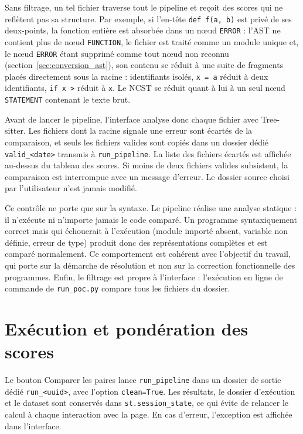 \documentclass[12pt,a4paper,oneside]{report}
\begin{document}
Sans filtrage, un tel fichier traverse tout le pipeline et reçoit des scores
qui ne reflètent pas sa structure. Par exemple, si l'en-tête
\texttt{def f(a, b)} est privé de ses deux-points, la fonction entière est
absorbée dans un nœud \texttt{ERROR} : l'AST ne contient plus de nœud
\texttt{FUNCTION}, le fichier est traité comme un module unique et, le
nœud \texttt{ERROR} étant supprimé comme tout nœud non reconnu
(section~\ref{sec:conversion_ast}), son contenu se réduit à une suite de
fragments placés directement sous la racine : identifiants isolés,
\texttt{x = a} réduit à deux identifiants, \texttt{if x >} réduit à
\texttt{x}. Le NCST se réduit quant à lui à un seul nœud \texttt{STATEMENT}
contenant le texte brut.

Avant de lancer le pipeline, l'interface analyse donc chaque fichier avec
Tree-sitter. Les fichiers dont la racine signale une erreur sont écartés de
la comparaison, et seuls les fichiers valides sont copiés dans un dossier
dédié \texttt{valid\_<date>} transmis à \texttt{run\_pipeline}. La liste des
fichiers écartés est affichée au-dessus du tableau des scores. Si moins de
deux fichiers valides subsistent, la comparaison est interrompue avec un
message d'erreur. Le dossier source choisi par l'utilisateur n'est jamais
modifié.

Ce contrôle ne porte que sur la syntaxe. Le pipeline réalise une analyse
statique : il n'exécute ni n'importe jamais le code comparé. Un programme
syntaxiquement correct mais qui échouerait à l'exécution (module importé
absent, variable non définie, erreur de type) produit donc des
représentations complètes et est comparé normalement. Ce comportement est
cohérent avec l'objectif du travail, qui porte sur la démarche de résolution
et non sur la correction fonctionnelle des programmes. Enfin, le filtrage est
propre à l'interface : l'exécution en ligne de commande de
\texttt{run\_poc.py} compare tous les fichiers du dossier.

\section{Exécution et pondération des scores}

Le bouton \og Comparer les paires \fg{} lance \texttt{run\_pipeline} dans un
dossier de sortie dédié \texttt{run\_<uuid>}, avec l'option \texttt{clean=True}.
Les résultats, le dossier d'exécution et le dataset sont conservés dans
\texttt{st.session\_state}, ce qui évite de relancer le calcul à chaque
interaction avec la page. En cas d'erreur, l'exception est affichée dans
l'interface.
\end{document}
